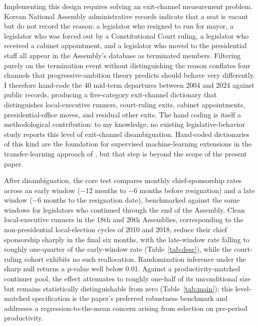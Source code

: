 \documentclass[11pt]{article}
\begin{document}
Implementing this design requires solving an exit-channel measurement problem. Korean National Assembly administrative records indicate that a seat is vacant but do not record the reason: a legislator who resigned to run for mayor, a legislator who was forced out by a Constitutional Court ruling, a legislator who received a cabinet appointment, and a legislator who moved to the presidential staff all appear in the Assembly's database as terminated members. Filtering purely on the termination event without distinguishing the reason conflates four channels that progressive-ambition theory predicts should behave very differently. I therefore hand-code the 40 mid-term departures between 2004 and 2024 against public records, producing a five-category exit-channel dictionary that distinguishes local-executive runners, court-ruling exits, cabinet appointments, presidential-office moves, and residual other exits. The hand coding is itself a methodological contribution: to my knowledge, no existing legislative-behavior study reports this level of exit-channel disambiguation. Hand-coded dictionaries of this kind are the foundation for supervised machine-learning extensions in the transfer-learning approach of \citet{laurer2023}, but that step is beyond the scope of the present paper.

After disambiguation, the core test compares monthly chief-sponsorship rates across an early window ($-$12 months to $-$6 months before resignation) and a late window ($-$6 months to the resignation date), benchmarked against the same windows for legislators who continued through the end of the Assembly. Clean local-executive runners in the 18th and 20th Assemblies, corresponding to the non-presidential local-election cycles of 2010 and 2018, reduce their chief sponsorship sharply in the final six months, with the late-window rate falling to roughly one-quarter of the early-window rate (Table~\ref{tab:desc}), while the court-ruling cohort exhibits no such reallocation. Randomization inference under the sharp null returns a p-value well below 0.01. Against a productivity-matched continuer pool, the effect attenuates to roughly one-half of its unconditional size but remains statistically distinguishable from zero (Table~\ref{tab:main}); this level-matched specification is the paper's preferred robustness benchmark and addresses a regression-to-the-mean concern arising from selection on pre-period productivity.
\end{document}
